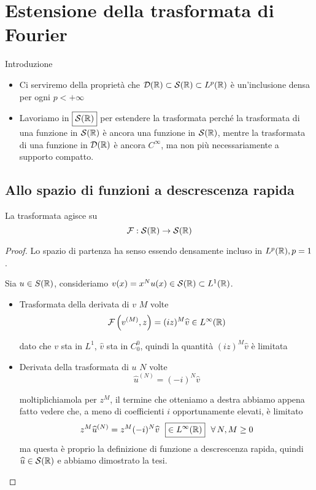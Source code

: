 \section{Estensione della trasformata di Fourier}

Introduzione
\begin{itemize}
\item Ci serviremo della proprietà che $\mathcal{D}(\mathbb{R}) \subset \mathcal{S}(\mathbb{R}) \subset L^{p}(\mathbb{R})$ è un'inclusione densa per ogni $p < + \infty $
\item Lavoriamo in $\boxed{\mathcal{S}(\mathbb{R})}$ per estendere la trasformata perché la trasformata di una funzione in $\mathcal{S}(\mathbb{R})$ è ancora una funzione in $\mathcal{S}(\mathbb{R})$, mentre la trasformata di una funzione in $\mathcal{D}(\mathbb{R})$ è ancora $C^{\infty}$, ma non più necessariamente a supporto compatto.
\end{itemize}

\subsection{Allo spazio di funzioni a descrescenza rapida}

\begin{thm}
La trasformata agisce su
\begin{equation*}
\mathcal{F} : \mathcal{S}(\mathbb{R})\rightarrow \mathcal{S}(\mathbb{R})
\end{equation*}
\end{thm}
\begin{proof}

Lo spazio di partenza ha senso essendo densamente incluso in $L^{p}(\mathbb{R}), p = 1$.

Sia $u\in S(\mathbb{R})$, consideriamo $v(x) = x^{N} u(x) \in \mathcal{S}(\mathbb{R}) \subset L^{1}(\mathbb{R})$.
\begin{itemize}
\item Trasformata della derivata di $v$ $M$ volte
\begin{equation*}
\mathcal{F}\left(v^{(M)}, z\right) = (iz)^{M}\widehat{v} \in L^{\infty}(\mathbb{R})
\end{equation*}

dato che $v$ sta in $L^{1}$, $\hat{v}$ sta in $C^{0}_{0}$, quindi la quantità $(iz)^{M}\hat{v}$ è limitata
\item Derivata della trasformata di $u$ $N$ volte
\begin{equation*}
\hat{u}^{(N)} = (- i)^{N}\hat{v}
\end{equation*}

moltiplichiamola per $z^{M}$, il termine che otteniamo a destra abbiamo appena fatto vedere che, a meno di coefficienti $i$ opportunamente elevati, è limitato
\begin{equation*}
z^{M}\hat{u}^{(N)} = z^{M}(- i)^{N}\hat{v} \ \ \boxed{\in L^{\infty}(\RR)} \ \ \forall N, M\geq 0
\end{equation*}ma questa è proprio la definizione di funzione a descrescenza rapida, quindi $\widehat{u} \in \mathcal{S}(\mathbb{R})$ e abbiamo dimostrato la tesi.
\end{itemize}
\end{proof}

